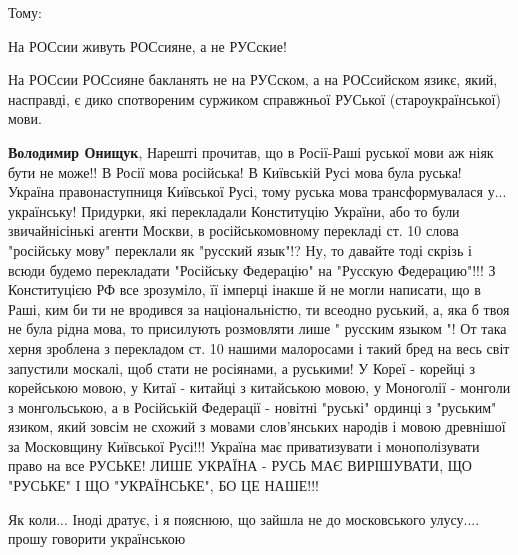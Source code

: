 \begin{itemize}
Тому:

На РОСсии живуть РОСсияне, а не РУСские!

На РОСсии РОСсияне бакланять не на РУСском, а на РОСсийском язикє, який,
насправді, є дико спотвореним суржиком справжньої РУСької (староукраїнської)
мови.

\begin{itemize}
 
\textbf{Володимир Онищук}, Нарешті прочитав, що в Росії-Раші руської мови аж
ніяк бути не може!! В Росії мова російська! В Київській Русі мова була руська!
Україна правонаступниця Київської Русі, тому руська мова трансформувалася у...
українську! Придурки, які перекладали Конституцію України, або то були
звичайнісінькі агенти Москви, в російськомовному перекладі ст. 10 слова
"російську мову" переклали як "русский язык"!? Ну, то давайте тоді скрізь і
всюди будемо перекладати "Російську Федерацію" на "Русскую Федерацию"!!! З
Конституцією РФ все зрозуміло, її імперці інакше й не могли написати, що в
Раші, ким би ти не вродився за національністю, ти всеодно руський, а, яка б
твоя не була рідна мова, то присилують розмовляти лише " русским языком "! От
така херня зроблена з перекладом ст. 10 нашими малоросами і такий бред на весь
світ запустили москалі, щоб стати не росіянами, а руськими! У Кореї - корейці з
корейською мовою, у Китаї - китайці з китайською мовою, у Моноголії - монголи з
монгольською, а в Російській Федерації - новітні "руські" ординці з "руським"
язиком, який зовсім не схожий з мовами слов'янських народів і мовою древнішої
за Московщину Київської Русі!!! Україна має приватизувати і монополізувати
право на все РУСЬКЕ! ЛИШЕ УКРАЇНА - РУСЬ МАЄ ВИРІШУВАТИ, ЩО "РУСЬКЕ" І ЩО
"УКРАЇНСЬКЕ", БО ЦЕ НАШЕ!!!
\end{itemize}

 
Як коли...
Іноді дратує, і я пояснюю, що зайшла не до московського улусу.... прошу говорити українською

 

\end{itemize}
